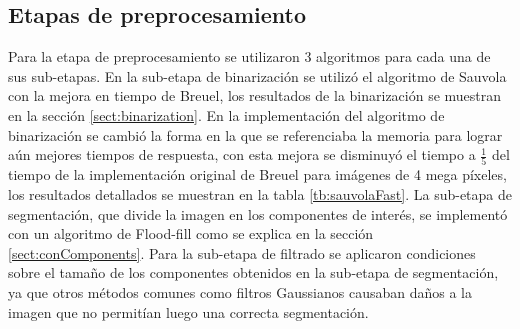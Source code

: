 \documentclass[a4paper, 11pt, oneside]{report}
\begin{document}
\subsection{Etapas de preprocesamiento}
Para la etapa de preprocesamiento se utilizaron 3 algoritmos para cada una de sus sub-etapas. En la sub-etapa de binarización se utilizó el algoritmo de Sauvola con la mejora en tiempo de Breuel, los resultados de la binarización se muestran en la sección \ref{sect:binarization}. En la implementación del algoritmo de binarización se cambió la forma en la que se referenciaba la memoria para lograr aún mejores tiempos de respuesta, con esta mejora se disminuyó el tiempo a $\frac{1}{5}$ del tiempo de la implementación original de Breuel para imágenes de 4 mega píxeles, los resultados detallados se muestran en la tabla \ref{tb:sauvolaFast}.
La sub-etapa de segmentación, que divide la imagen en los componentes de interés, se implementó con un algoritmo de Flood-fill como se explica en la sección \ref{sect:conComponents}. Para la sub-etapa de filtrado se aplicaron condiciones sobre el tamaño de los componentes obtenidos en la sub-etapa de segmentación, ya que otros métodos comunes como filtros Gaussianos causaban daños a la imagen que no permitían luego una correcta segmentación.
\end{document}
